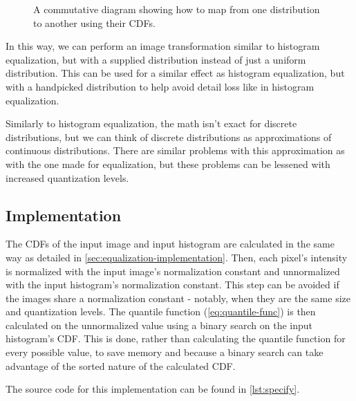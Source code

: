 \documentclass[headings=optiontoheadandtoc,listof=totoc,parskip=full]{scrartcl}
\begin{document}
\begin{figure}[H]
	\centering
	\caption{A commutative diagram showing how to map from one distribution to another using their CDFs.}
	\label{fig:specification-cd}
\end{figure}

In this way, we can perform an image transformation similar to histogram equalization, but with a supplied distribution instead of just a uniform distribution. This can be used for a similar effect as histogram equalization, but with a handpicked distribution to help avoid detail loss like in histogram equalization.\par

Similarly to histogram equalization, the math isn't exact for discrete distributions, but we can think of discrete distributions as approximations of continuous distributions. There are similar problems with this approximation as with the one made for equalization, but these problems can be lessened with increased quantization levels.

\subsection{Implementation}

The CDFs of the input image and input histogram are calculated in the same way as detailed in \cref{sec:equalization-implementation}. Then, each pixel's intensity is normalized with the input image's normalization constant and unnormalized with the input histogram's normalization constant. This step can be avoided if the images share a normalization constant - notably, when they are the same size and quantization levels. The quantile function (\cref{eq:quantile-func}) is then calculated on the unnormalized value using a binary search on the input histogram's CDF. This is done, rather than calculating the quantile function for every possible value, to save memory and because a binary search can take advantage of the sorted nature of the calculated CDF. \par

The source code for this implementation can be found in \cref{lst:specify}.
\end{document}
